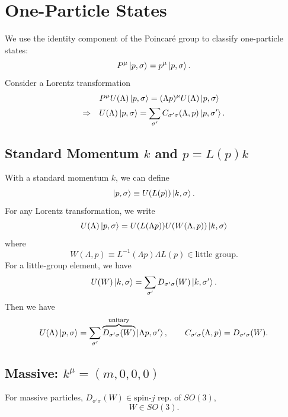 \section{One-Particle States}
We use the identity component of the Poincar\'e group to classify one-particle states:
\begin{equation}
    P^\mu \ket{p, \sigma} = p^\mu \ket{p, \sigma}.
\end{equation}
Consider a Lorentz transformation
\begin{align}
    & P^\mu U(\Lambda) \ket{p, \sigma} = (\Lambda p)^\mu U(\Lambda) \ket{p, \sigma} \\
    \Rightarrow \quad & U(\Lambda) \ket{p, \sigma} = \sum_{\sigma'} C_{\sigma' \sigma} (\Lambda, p) \ket{p, \sigma'}.
\end{align}
\subsection{\texorpdfstring{Standard Momentum $k$ and $p = L(p) k$}{Standard Momentum k and p = L(p)k}}
With a standard momentum $k$, we can define
\begin{equation}
    \ket{p, \sigma} \equiv U(L(p)) \ket{k, \sigma}.
\end{equation}
For any Lorentz transformation, we write
\begin{equation}
    U(\Lambda) \ket{p, \sigma} = U(L(\Lambda p)) U(W(\Lambda, p)) \ket{k, \sigma}
\end{equation}
where
\begin{equation}
    W(\Lambda, p) \equiv L^{ - 1} (\Lambda p) \Lambda L(p) \in \text{little group}.
\end{equation}
For a little-group element, we have
\begin{equation}
    U(W) \ket{k, \sigma} = \sum_{\sigma'} D_{\sigma' \sigma} (W) \ket{k, \sigma'}.
\end{equation}
Then we have
\begin{equation}
    U(\Lambda) \ket{p, \sigma} = \sum_{\sigma'} \overbrace{D_{\sigma' \sigma} (W)}^{\text{unitary}} \ket{\Lambda p, \sigma'}, \qquad C_{\sigma' \sigma} (\Lambda, p) = D_{\sigma' \sigma} (W).
\end{equation}
\subsection{\texorpdfstring{Massive: $k^\mu = (m, 0, 0, 0)$}{Massive: k = (m,0,0,0)}}
For massive particles, $D_{\sigma' \sigma} (W) \in \text{spin-}j \text{ rep. of }SO(3)$,
\begin{equation}
    W \in SO(3).
\end{equation}
